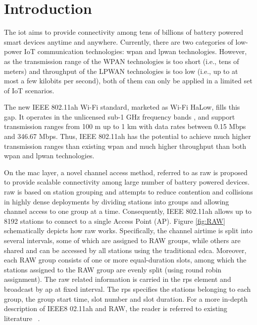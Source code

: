 \section{Introduction}


The \gls{iot} aims to provide connectivity among tens of billions of battery powered smart devices anytime and anywhere. Currently, there are two categories of low-power IoT communication technologies: \gls{wpan} and \gls{lpwan} technologies. However, as the transmission range of the WPAN technologies is too short (i.e., tens of meters) and throughput of the LPWAN technologies is too low (i.e., up to at most a few kilobits per
second), both of them can only be applied in a limited set of IoT scenarios. 

The new IEEE 802.11ah Wi-Fi standard, marketed as Wi-Fi HaLow, fills this gap.
It operates in the unlicensed sub-1 GHz frequency bands , and support transmission ranges from 100 m up to 1 km with data rates between 0.15 Mbps and 346.67 Mbps. Thus, IEEE 802.11ah has the potential to achieve much higher
transmission ranges than existing \gls{wpan} and much higher throughput than both \gls{wpan} and \gls{lpwan}
technologies. 

On the \gls{mac} layer, a novel channel access method, referred to as \gls{raw} is proposed to provide scalable
connectivity among large number of battery powered devices. \gls{raw} is based on station grouping and attempts to
reduce contention and collisions in highly dense deployments by dividing stations into groups and allowing channel access to one group at a time. Consequently, IEEE 802.11ah allows up to 8192 stations to connect to a single Access Point (AP). Figure \ref{fig:RAW} schematically depicts how \gls{raw} works. Specifically, the channel airtime is split into several intervals, some of which are assigned to RAW groups, while others are shared and can be accessed by all stations using the traditional \gls{edca}. Moreover, each RAW group consists of one or more equal-duration slots, among which the stations assigned to the RAW group are evenly split (using round robin assignment). The \gls{raw} related information is carried in the \gls{rps} element and broadcast by \gls{ap} at fixed interval. The \gls{rps} specifies the stations belonging to each group, the group start time, slot number and slot duration. For a more in-depth description of IEEE8 02.11ah and RAW, the reader is referred to existing literature ~\cite{Khorov2015a,Sensor2017, sensors80211ah}.

